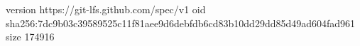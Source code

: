 version https://git-lfs.github.com/spec/v1
oid sha256:7dc9b03c39589525c11f81aee9d6debfdb6cd83b10dd29dd85d49ad604fad961
size 174916
